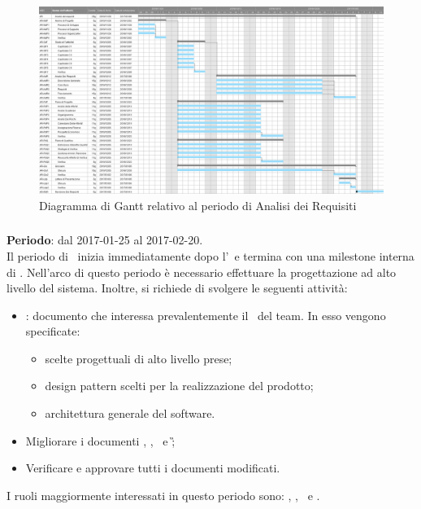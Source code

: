 		\begin{figure}[ht]
			\centering
			\includegraphics[angle=90,scale=0.37]{img/ganttnetbreak1.png}
			\caption{Diagramma di Gantt relativo al periodo di Analisi dei Requisiti}
		\end{figure}
		\FloatBarrier
		
		\subsubsection{\PA}
		\textbf{Periodo}: dal 2017-01-25 al 2017-02-20.\\
		Il periodo di \PA\ inizia immediatamente dopo l'\AR\ e termina con una milestone interna di \RPMin. Nell'arco di questo periodo è necessario effettuare la progettazione ad alto livello del sistema. Inoltre, si richiede di svolgere le seguenti attività:
		\begin{itemize}
			\item \textit{\ST}: documento che interessa prevalentemente il \Prog\ del team. In esso vengono specificate:
			\begin{itemize}
				\item scelte progettuali di alto livello prese;
				\item design pattern scelti per la realizzazione del prodotto;
				\item architettura generale del software.
			\end{itemize}
			\item Migliorare i documenti \NdP, \PdP, \PdQ\ e \G;
			\item Verificare e approvare tutti i documenti modificati.
		\end{itemize}
		I ruoli maggiormente interessati in questo periodo sono: \Amm, \Res, \Prog\ e \Ver.
	
